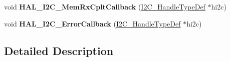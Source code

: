 \begin{DoxyCompactItemize}
\item 
void {\bfseries H\+A\+L\+\_\+\+I2\+C\+\_\+\+Mem\+Rx\+Cplt\+Callback} (\hyperlink{struct_i2_c___handle_type_def}{I2\+C\+\_\+\+Handle\+Type\+Def} $\ast$hi2c)\hypertarget{group___i2_c___exported___functions___group2_gac16a95413b35f05c5ce725fefd8531a5}{}\label{group___i2_c___exported___functions___group2_gac16a95413b35f05c5ce725fefd8531a5}

\item 
void {\bfseries H\+A\+L\+\_\+\+I2\+C\+\_\+\+Error\+Callback} (\hyperlink{struct_i2_c___handle_type_def}{I2\+C\+\_\+\+Handle\+Type\+Def} $\ast$hi2c)\hypertarget{group___i2_c___exported___functions___group2_ga4d5338cd64a656dfdc4154773bc4f05d}{}\label{group___i2_c___exported___functions___group2_ga4d5338cd64a656dfdc4154773bc4f05d}

\end{DoxyCompactItemize}


\subsection{Detailed Description}
